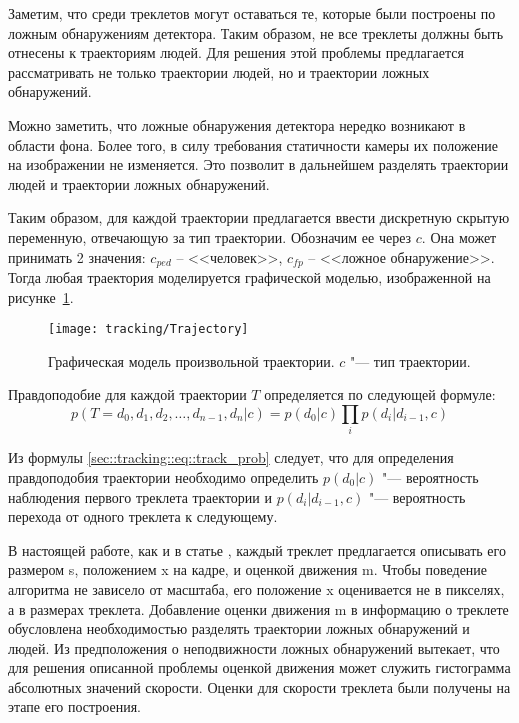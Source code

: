 Заметим, что среди треклетов могут оставаться те, которые были построены по ложным обнаружениям детектора. Таким образом, не все треклеты должны быть отнесены к траекториям людей. Для решения этой проблемы предлагается рассматривать не только траектории людей, но и траектории ложных обнаружений.

Можно заметить, что ложные обнаружения детектора нередко возникают в области фона. Более того, в силу требования статичности камеры их положение на изображении не изменяется. Это позволит в дальнейшем разделять траектории людей и траектории ложных обнаружений. 

Таким образом, для каждой траектории предлагается ввести дискретную скрытую переменную, отвечающую за тип траектории. Обозначим ее через $c$. Она может принимать 2 значения: $c_{ped}$ – <<человек>>, $c_{fp}$ – <<ложное обнаружение>>. Тогда любая траектория моделируется графической моделью, изображенной на рисунке~\ref{sec::tracking::fig::trajectory}.

\begin{figure}[t]
	\begin{center}
		\texttt{[image: tracking/Trajectory]}
		\caption{Графическая модель произвольной траектории. $c$ "--- тип траектории.}
		\label{sec::tracking::fig::trajectory}
	\end{center}
\end{figure}

Правдоподобие для каждой траектории $T$ определяется по следующей формуле:
\begin{equation}
	p(T={d_0, d_1, d_2, \dots, d_{n-1}, d_n}|c) = p(d_0|c)\prod_ip(d_i|d_{i-1}, c)
	\label{sec::tracking::eq::track_prob}
\end{equation}

Из формулы \eqref{sec::tracking::eq::track_prob} следует, что для определения правдоподобия траектории необходимо определить $p(d_0 |c)$ "--- вероятность наблюдения первого треклета траектории и  $p(d_i|d_{i-1}, c)$ "--- вероятность перехода от одного треклета к следующему.

В настоящей работе, как и в статье \cite{benfold2011stable}, каждый треклет предлагается описывать его размером s, положением x на кадре, и оценкой движения m. Чтобы поведение алгоритма не зависело от масштаба, его положение x оценивается не в пикселях, а в размерах треклета. Добавление оценки движения m в информацию о треклете обусловлена необходимостью разделять траектории ложных обнаружений и людей. Из предположения о неподвижности ложных обнаружений вытекает, что для решения описанной проблемы оценкой движения может служить гистограмма абсолютных значений скорости. Оценки для скорости треклета были получены на этапе его построения.

